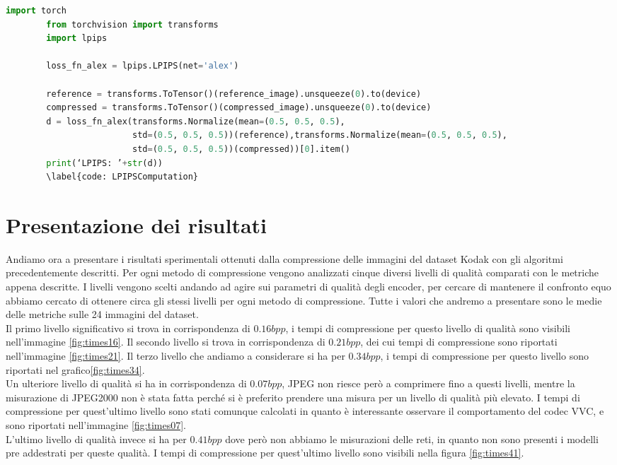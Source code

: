 \begin{adjustbox}{max width=\textwidth}   
    \begin{lstlisting}[language=Python, caption=Spezzone di codice per il calcolo dell'LPIPS con AlexNet, label=code:LPIPSComputation]
        import torch
        from torchvision import transforms
        import lpips
        
        loss_fn_alex = lpips.LPIPS(net='alex')
        
        reference = transforms.ToTensor()(reference_image).unsqueeze(0).to(device)
        compressed = transforms.ToTensor()(compressed_image).unsqueeze(0).to(device)
        d = loss_fn_alex(transforms.Normalize(mean=(0.5, 0.5, 0.5),
                         std=(0.5, 0.5, 0.5))(reference),transforms.Normalize(mean=(0.5, 0.5, 0.5),
                         std=(0.5, 0.5, 0.5))(compressed))[0].item()
        print(‘LPIPS: ’+str(d))
        \label{code: LPIPSComputation}
    \end{lstlisting}
\end{adjustbox} 
    

\section{Presentazione dei risultati}
Andiamo ora a presentare i risultati sperimentali ottenuti dalla compressione delle immagini del dataset Kodak con gli algoritmi precedentemente descritti. Per ogni metodo di compressione vengono analizzati cinque diversi livelli di qualità comparati con le metriche appena descritte. I livelli vengono scelti andando ad agire sui parametri di qualità degli encoder, per cercare di mantenere il confronto equo abbiamo cercato di ottenere circa gli stessi livelli per ogni metodo di compressione. Tutte i valori che andremo a presentare sono le medie delle metriche sulle 24 immagini del dataset.\\
Il primo livello significativo si trova in corrispondenza di $0.16bpp$, i tempi di compressione per questo livello di qualità sono visibili nell’immagine \ref{fig:times16}. Il secondo livello si trova in corrispondenza di $0.21bpp$, dei cui tempi di compressione sono riportati nell’immagine \ref{fig:times21}. Il terzo livello che andiamo a considerare si ha per $0.34bpp$, i tempi di compressione per questo livello sono riportati nel grafico\ref{fig:times34}.\\
Un ulteriore livello di qualità si ha in corrispondenza di $0.07bpp$, JPEG non riesce però a comprimere fino a questi livelli, mentre la misurazione di JPEG2000 non è stata fatta perché si è preferito prendere una misura per un livello di qualità più elevato. I tempi di compressione per quest’ultimo livello sono stati comunque calcolati in quanto è interessante osservare il comportamento del codec VVC, e sono riportati nell’immagine \ref{fig:times07}.\\
L’ultimo livello di qualità invece si ha per $0.41bpp$ dove però non abbiamo le misurazioni delle reti, in quanto non sono presenti i modelli pre addestrati per queste qualità. I tempi di compressione per quest’ultimo livello sono visibili nella figura \ref{fig:times41}.\\

